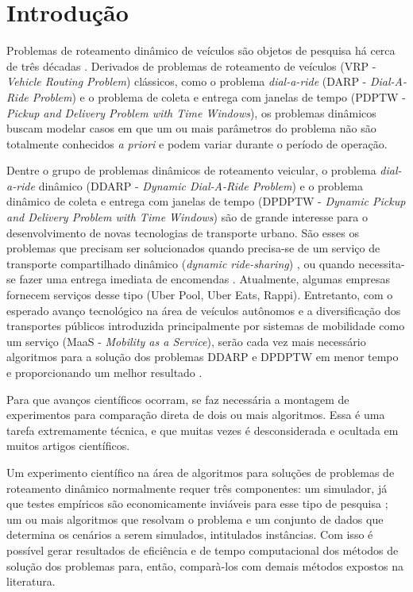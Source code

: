 \chapter{Introdução}\label{ch:introducao}

Problemas de roteamento dinâmico de veículos são objetos de pesquisa há cerca 
de três décadas \cite{psaraftis_dynamic_2015}.
Derivados de problemas de roteamento de veículos (VRP - \textit{Vehicle Routing
Problem}) clássicos, como o problema \textit{dial-a-ride} (DARP -
\textit{Dial-A-Ride Problem}) e o problema de coleta e entrega com
janelas de tempo (PDPTW - \textit{Pickup and Delivery Problem with 
Time Windows}), os problemas dinâmicos buscam modelar casos em que um 
ou mais parâmetros do problema não são totalmente conhecidos 
\textit{a priori} e podem variar durante o período de operação. 

Dentre o grupo de problemas dinâmicos de roteamento veicular, o problema 
\textit{dial-a-ride} dinâmico (DDARP - \textit{Dynamic Dial-A-Ride Problem}) 
\cite{psaraftis_dynamic_1988} e o problema dinâmico de coleta e entrega com
janelas de tempo (DPDPTW - \textit{Dynamic Pickup and Delivery Problem with 
Time Windows}) \cite{dumas_1991} são de grande interesse para o 
desenvolvimento de novas tecnologias de transporte urbano. 
São esses os problemas que precisam ser solucionados quando precisa-se 
de um serviço de transporte compartilhado dinâmico (\textit{dynamic 
ride-sharing}) \cite{agatz_optimization_2012, 
alonso-gonzalez_potential_2018}, ou quando necessita-se 
fazer uma entrega imediata de encomendas \cite{pankratz_dynamic_2005}.
Atualmente, algumas empresas fornecem serviços desse tipo (Uber Pool, Uber
Eats, Rappi).
Entretanto, com o esperado avanço tecnológico na área de veículos
autônomos e a diversificação dos transportes públicos introduzida
principalmente por sistemas de mobilidade como um serviço (MaaS -
\textit{Mobility as a Service}), serão cada vez mais necessário algoritmos 
para a solução dos problemas DDARP e DPDPTW em menor tempo e proporcionando 
um melhor resultado \cite{fulton_three_2017}. 

Para que avanços científicos ocorram, se faz necessária a montagem
de experimentos para comparação direta de dois ou mais algoritmos. 
Essa é uma tarefa extremamente técnica, e que muitas vezes é
desconsiderada e ocultada em muitos artigos científicos.

Um experimento científico na área de algoritmos para soluções de problemas 
de roteamento dinâmico normalmente requer três componentes: um simulador, já 
que testes empíricos são economicamente inviáveis para esse tipo de pesquisa 
\cite{maciejewski_towards_2017}; um ou mais algoritmos que resolvam o problema 
e um conjunto de dados que determina os cenários a serem simulados, intitulados
instâncias.
Com isso é possível gerar resultados de eficiência e de tempo computacional dos
métodos de solução dos problemas para, então, comparà-los com demais métodos
expostos na literatura.


